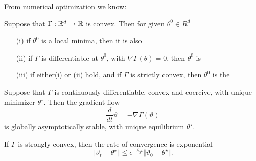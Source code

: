 From numerical optimization we know:
\begin{theorem}\label{thm:29}
    Suppose that \(\Gamma:\mathbb{R}^d\to\mathbb{R}\) is convex. Then for given \(\theta^0\in R^d\)
    \begin{enumerate}
        \item[(i)] if \(\theta^0\) is a local minima, then it is also 
        \item[(ii)] if \(\Gamma\) is differentiable at \(\theta^0\), with \(\nabla\Gamma(\theta)=0\), then \(\theta^0\) is 
        \item[(iii)] if either(i) or (ii) hold, and if \(\Gamma\) is strictly convex, then \(\theta^0\) is the    
    \end{enumerate}
\end{theorem}

\begin{proposition}\label{prop:30}
    Suppose that \(\Gamma\) is continuously differentiable, convex and coercive,
    with unique minimizer \(\theta^\star\). Then the gradient flow 
    \[\frac{d}{dt}\vartheta=-\nabla\Gamma(\vartheta)\]
    is globally asymptotically stable, with unique equilibrium
    \(\theta^\star\). 
    
    If \(\Gamma\) is strongly convex, then the rate of convergence is exponential
    \[\Vert \vartheta_t-\theta^\star\Vert\leq e^{-\delta_0 t}\Vert \vartheta_0-\theta^\star\Vert.\]
\end{proposition}
